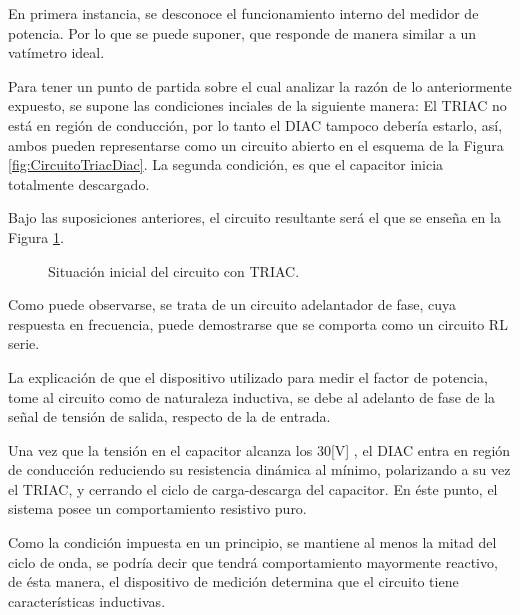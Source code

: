 En primera instancia, se desconoce el funcionamiento interno del medidor de potencia.
Por lo que se puede suponer, que responde de manera similar a un vatímetro ideal.

Para tener un punto de partida sobre el cual analizar la razón de lo anteriormente 
expuesto, se supone las condiciones 
inciales de la siguiente manera: El TRIAC no está en región de conducción, por 
lo tanto el DIAC tampoco debería estarlo, así, ambos pueden representarse como 
un circuito abierto en el esquema de la Figura \ref{fig:CircuitoTriacDiac}. La 
segunda condición, es que el capacitor inicia totalmente descargado.

Bajo las suposiciones anteriores, el circuito resultante será el que se enseña 
en la Figura \ref{fig:ConclusionRCTriac}.

\begin{figure}[H]
  \centering
  \caption{Situación inicial del circuito con TRIAC.}
  \label{fig:ConclusionRCTriac}
\end{figure}

Como puede observarse, se trata de un circuito adelantador de fase, cuya 
respuesta en frecuencia, puede demostrarse que se comporta como un circuito RL 
serie.

La explicación de que el dispositivo utilizado para medir el factor de potencia, 
tome al circuito como de naturaleza inductiva, se debe al adelanto de fase de la 
señal de tensión de salida, respecto de la de entrada.

Una vez que la tensión en el capacitor alcanza los 30[V] , el DIAC entra en región 
de conducción reduciendo su resistencia dinámica al mínimo, polarizando a su vez el 
TRIAC, y cerrando el ciclo de carga-descarga del capacitor. En éste punto, el sistema 
posee un comportamiento resistivo puro.

Como la condición impuesta en un principio, se mantiene 
al menos la mitad del ciclo de onda, se podría decir que tendrá comportamiento mayormente 
reactivo, de ésta manera, el dispositivo de medición determina que el circuito tiene 
características inductivas.






